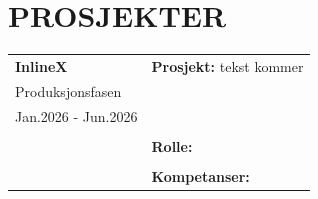 \documentclass[a4paper,10pt]{article}
\begin{document}
\section{{\Huge \ubuntu PROSJEKTER}}


\noindent
\begin{longtable}{@{}p{4cm}p{11cm}@{}}  %
\textbf{InlineX}
& \textbf{Prosjekt:} tekst kommer \\
Produksjonsfasen & \\
Jan.2026 - Jun.2026 & \\
& \\
&  \textbf{Rolle:} \\
& \\
& \textbf{Kompetanser:} \\
\end{longtable}

\vspace{2em}
\end{document}
